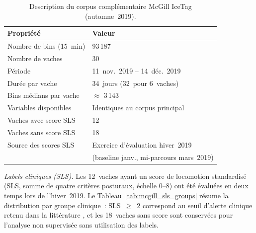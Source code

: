 \begin{table}[H]
    \centering
    \caption{Description du corpus complémentaire McGill IceTag (automne~2019).}
    \label{tab:dataset_mcgill}
    \begin{tabular}{ll}
        \toprule
        \textbf{Propriété}              & \textbf{Valeur} \\
        \midrule
        Nombre de bins (15~min)         & 93\,187 \\
        Nombre de vaches                & 30 \\
        Période                         & 11~nov.~2019 -- 14~déc.~2019 \\
        Durée par vache                 & 34~jours (32~pour 6~vaches) \\
        Bins médians par vache          & $\approx$ 3\,143 \\
        Variables disponibles           & Identiques au corpus principal \\
        Vaches avec score SLS           & 12 \\
        Vaches sans score SLS           & 18 \\
        Source des scores SLS           & Exercice d'évaluation hiver~2019\\
                                        & (baseline janv., mi-parcours mars~2019) \\
        \bottomrule
    \end{tabular}
\end{table}

\textit{Labels cliniques (SLS).}
Les 12~vaches ayant un score de locomotion standardisé (SLS, somme de quatre critères
posturaux, échelle 0--8) ont été évaluées en deux temps lors de l'hiver~2019. Le
Tableau~\ref{tab:mcgill_sls_groups} résume la distribution par groupe clinique~:
SLS~$\geq$~2 correspond au seuil d'alerte clinique retenu dans la littérature
\citep{sprecher1997lameness}, et les 18~vaches sans score sont conservées pour l'analyse
non supervisée sans utilisation des labels.

